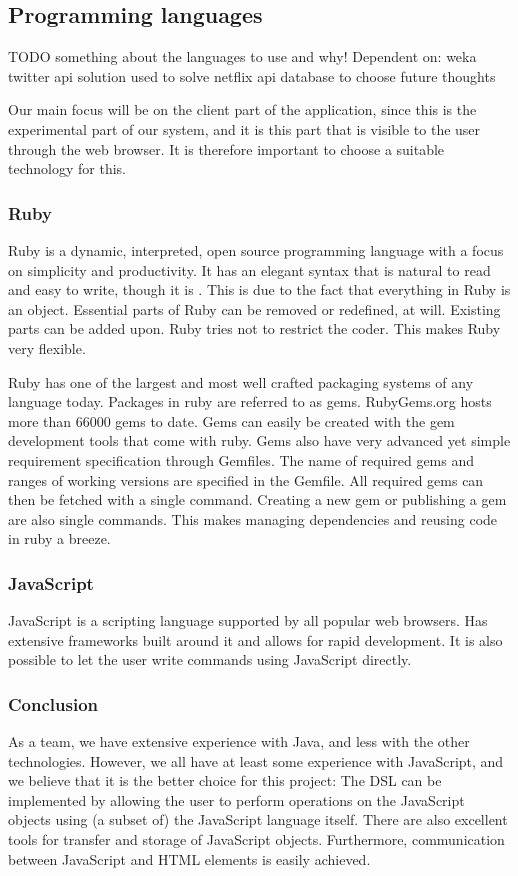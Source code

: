 \subsection{Programming languages}
TODO something about the languages to use and why!
Dependent on:
    weka
    twitter api
    solution used to solve netflix api
    database to choose
    future thoughts


Our main focus will be on the client part of the application, since this is the experimental part of our system, and it is this part that is visible to the user through the web browser. It is therefore important to choose a suitable technology for this.

\subsubsection{Ruby}
Ruby is a dynamic, interpreted, open source programming language with a focus on simplicity and productivity. It has an elegant syntax that is natural to read and easy to write, though it is . This is due to the fact that everything in Ruby is an object. Essential parts of Ruby can be removed or redefined, at will. Existing parts can be added upon. Ruby tries not to restrict the coder. This makes Ruby very flexible. \cite{ruby-about}

Ruby has one of the largest and most well crafted packaging systems of any language today. Packages in ruby are referred to as gems. RubyGems.org hosts more than 66000 gems to date. Gems can easily be created with the gem development tools that come with ruby. Gems also have very advanced yet simple requirement specification through Gemfiles. The name of required gems and ranges of working versions are specified in the Gemfile. All required gems can then be fetched with a single command. Creating a new gem or publishing a gem are also single commands. This makes managing dependencies and reusing code in ruby a breeze.\cite{rubygems}


\subsubsection{JavaScript}

JavaScript is a scripting language supported by all popular web browsers. Has extensive frameworks built around it and allows for rapid development. It is also possible to let the user write commands using JavaScript directly.

\subsubsection{Conclusion}
As a team, we have extensive experience with Java, and less with the other technologies. However, we all have at least some experience with JavaScript, and we believe that it is the better choice for this project: The DSL can be implemented by allowing the user to perform operations on the JavaScript objects using (a subset of) the JavaScript language itself. There are also excellent tools for transfer and storage of JavaScript objects. Furthermore, communication between JavaScript and HTML elements is easily achieved.






